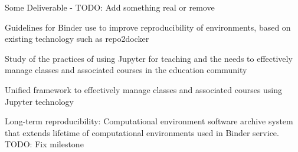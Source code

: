 \begin{workpackage}
\begin{wpdelivs}
\begin{wpdeliv}[due=1,miles=startup,id=infrastructure,dissem=PU,nature=DEC,lead=SRL]
  {Some Deliverable - TODO: Add something real or remove}
\end{wpdeliv}
\begin{wpdeliv}[due=12,miles=startup,id=binder-guidelines,dissem=PU,nature=DEC,lead=XFEL]
  {Guidelines for Binder use to improve reproducibility of
  environments, based on existing technology such as repo2docker}
\end{wpdeliv}
\begin{wpdeliv}[due=12,miles=startup,id=teaching-report,dissem=PU,nature=R,lead=EP]
  {Study of the practices of using Jupyter for teaching and the needs to
  effectively manage classes and associated courses in the education community}
\end{wpdeliv} 
\begin{wpdeliv}[due=36,miles=startup,id=nbgrader-like,dissem=PU,nature=OTHER,lead=EP]
  {Unified framework to effectively manage classes and associated courses
  using Jupyter technology}
\end{wpdeliv}
\begin{wpdeliv}[due=48,miles=startup,id=jupyter-archive,dissem=PU,nature=OTHER,lead=XFEL]
  {Long-term reproducibility: Computational environment software
    archive system that extends lifetime of computational environments
  used in Binder service. TODO: Fix milestone}
\end{wpdeliv}


\end{wpdelivs}
\end{workpackage}


